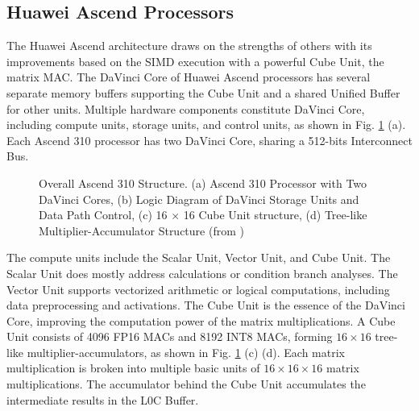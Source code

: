 \documentclass[12pt]{extbook}
\begin{document}
\subsection{Huawei Ascend Processors}

The Huawei Ascend architecture draws on the strengths of others with its improvements based on the SIMD execution with a powerful Cube Unit, the matrix MAC. The DaVinci Core of Huawei Ascend processors has several separate memory buffers supporting the Cube Unit and a shared Unified Buffer for other units. Multiple hardware components constitute DaVinci Core, including compute units, storage units, and control units, as shown in Fig. \ref{fig:dav} (a). Each Ascend 310 processor has two DaVinci Core, sharing a 512-bits Interconnect Bus.

\begin{figure}[tb]
    \caption{Overall Ascend 310 Structure. (a) Ascend 310 Processor with Two DaVinci Cores, (b) Logic Diagram of DaVinci Storage Units and Data Path Control, (c) 16 $\times$ 16 Cube Unit structure, (d) Tree-like Multiplier-Accumulator Structure (from \cite{DBLP:conf/hotchips/LiaoTXZ19})}
    \label{fig:dav}
    \end{figure}

The compute units include the Scalar Unit, Vector Unit, and Cube Unit. The Scalar Unit does mostly address calculations or condition branch analyses. The Vector Unit supports vectorized arithmetic or logical computations, including data preprocessing and activations. The Cube Unit is the essence of the DaVinci Core, improving the computation power of the matrix multiplications. A Cube Unit consists of 4096 FP16 MACs and 8192 INT8 MACs, forming $16 \times 16$ tree-like multiplier-accumulators, as shown in Fig. \ref{fig:dav} (c) (d). Each matrix multiplication is broken into multiple basic units of $16 \times 16 \times 16$ matrix multiplications. The accumulator behind the Cube Unit accumulates the intermediate results in the L0C Buffer.
\end{document}
